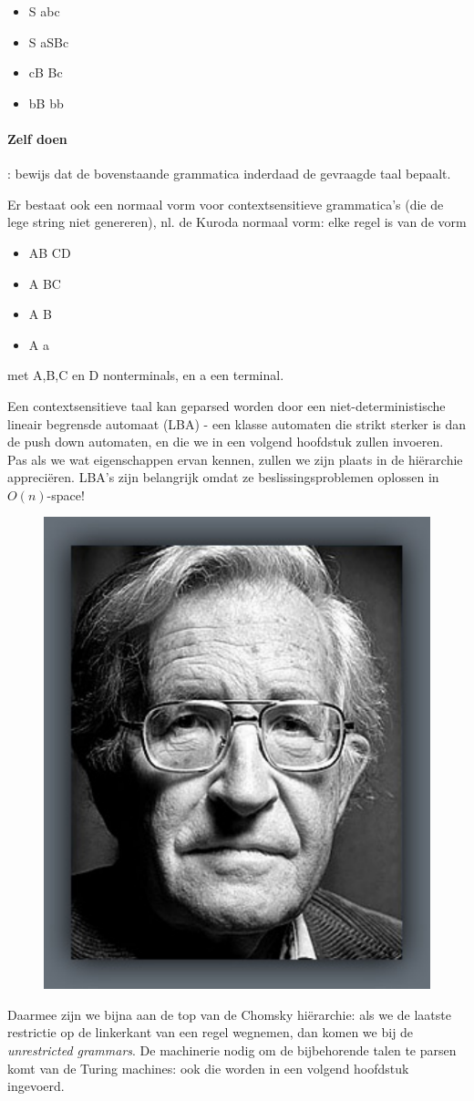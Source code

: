 \begin{itemize}
\item[] S \rpijl abc
\item[] S \rpijl aSBc
\item[] cB \rpijl  Bc
\item[] bB \rpijl  bb 
\end{itemize}

\paragraph{Zelf doen}: bewijs dat de bovenstaande grammatica inderdaad
de gevraagde taal bepaalt.

\clearpage

Er bestaat ook een normaal vorm voor contextsensitieve grammatica's
(die de lege string niet genereren), nl. de Kuroda normaal vorm: elke
regel is van de vorm

\begin{itemize}
\item[] AB \rpijl CD
\item[] A \rpijl BC
\item[] A \rpijl B
\item[] A \rpijl a
\end{itemize}

met A,B,C en D nonterminals, en a een terminal.


Een contextsensitieve taal kan geparsed worden door een
niet-deterministische lineair begrensde automaat (LBA) - een klasse
automaten die strikt sterker is dan de push down automaten, en die we
in een volgend hoofdstuk zullen invoeren.  Pas als we wat
eigenschappen ervan kennen, zullen we zijn plaats in de hi\"erarchie
appreci\"eren.  LBA's zijn belangrijk omdat ze beslissingsproblemen
oplossen in $O(n)$-space!


\begin{figure}
\includegraphics[width=.2\textwidth,keepaspectratio]{afbeeldingen/chomsky}
\end{figure}
Daarmee zijn we bijna aan de top van de Chomsky hi\"erarchie: 
als we de
laatste restrictie op de linkerkant van een regel wegnemen, dan komen
we bij de {\em unrestricted grammars}. De machinerie nodig om de
bijbehorende talen te parsen komt van de Turing machines: ook die
worden in een volgend hoofdstuk ingevoerd.


